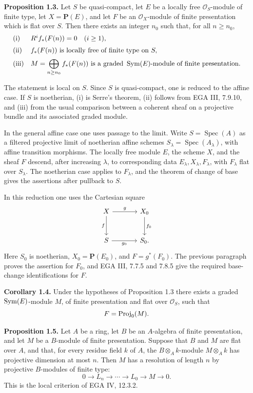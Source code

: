 \documentclass[11pt]{article}
\newcommand{\Spec}{\operatorname{Spec}}
\begin{document}
\textbf{Proposition 1.3.} Let \(S\) be quasi-compact, let \(E\) be a locally free \(\mathcal O_S\)-module of finite type, let \(X=\mathbf P(E)\), and let \(F\) be an \(\mathcal O_X\)-module of finite presentation which is flat over \(S\). Then there exists an integer \(n_0\) such that, for all \(n\geq n_0\),
\[
\begin{array}{ll}
\text{\rm (i)}& R^i f_*(F(n))=0\quad (i\geq 1),\\[2mm]
\text{\rm (ii)}& f_*(F(n))\text{ is locally free of finite type on }S,\\[2mm]
\text{\rm (iii)}& \displaystyle M=\bigoplus_{n\geq n_0} f_*(F(n))
\text{ is a graded }\operatorname{Sym}(E)\text{-module of finite presentation.}
\end{array}
\]

The statement is local on \(S\). Since \(S\) is quasi-compact, one is reduced to the affine case. If \(S\) is noetherian, (i) is Serre's theorem, (ii) follows from EGA III, 7.9.10, and (iii) from the usual comparison between a coherent sheaf on a projective bundle and its associated graded module.

In the general affine case one uses passage to the limit. Write \(S=\Spec(A)\) as a filtered projective limit of noetherian affine schemes \(S_\lambda=\Spec(A_\lambda)\), with affine transition morphisms. The locally free module \(E\), the scheme \(X\), and the sheaf \(F\) descend, after increasing \(\lambda\), to corresponding data \(E_\lambda,X_\lambda,F_\lambda\), with \(F_\lambda\) flat over \(S_\lambda\). The noetherian case applies to \(F_\lambda\), and the theorem of change of base gives the assertions after pullback to \(S\).

In this reduction one uses the Cartesian square
\[
\begin{tikzcd}[column sep=large,row sep=large]
X \arrow[r,"g"] \arrow[d,"f"'] & X_0 \arrow[d,"f_0"]\\
S \arrow[r,"g_0"'] & S_0 .
\end{tikzcd}
\]
Here \(S_0\) is noetherian, \(X_0=\mathbf P(E_0)\), and \(F=g^*(F_0)\). The previous paragraph proves the assertion for \(F_0\), and EGA III, 7.7.5 and 7.8.5 give the required base-change identifications for \(F\).

\textbf{Corollary 1.4.} Under the hypotheses of Proposition 1.3 there exists a graded \(\operatorname{Sym}(E)\)-module \(M\), of finite presentation and flat over \(\mathcal O_S\), such that
\[
  F=\operatorname{Proj}_0(M).
\]

\textbf{Proposition 1.5.} Let \(A\) be a ring, let \(B\) be an \(A\)-algebra of finite presentation, and let \(M\) be a \(B\)-module of finite presentation. Suppose that \(B\) and \(M\) are flat over \(A\), and that, for every residue field \(k\) of \(A\), the \(B\otimes_A k\)-module \(M\otimes_A k\) has projective dimension at most \(n\). Then \(M\) has a resolution of length \(n\) by projective \(B\)-modules of finite type:
\[
  0\longrightarrow L_n\longrightarrow\cdots\longrightarrow L_0\longrightarrow M\longrightarrow 0.
\]
This is the local criterion of EGA IV, 12.3.2.
\end{document}
